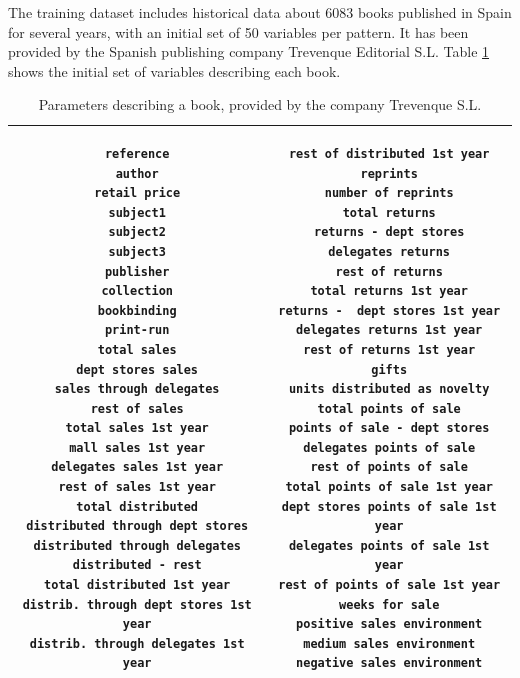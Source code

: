\documentclass[a4paper,10pt,twocolumn,preprint,3p]{elsarticle}
\begin{document}
The training dataset includes historical data about 6083 books
published in Spain for several years, with an initial set of 50
variables per pattern. It has been provided by the Spanish publishing
company Trevenque Editorial S.L. Table 
\ref{tabla:paramsOrig50} shows the initial set of variables describing
each book. 

\begin{table}[!ht]
\caption{Parameters describing a book, provided by the company Trevenque S.L.}
\label{tabla:paramsOrig50}
\begin{center}
\begin{tabular}{|c|c|}
\hline 

\begin{minipage}{2.45in}\begin{small}
 \begin{verbatim}
reference
author
retail price
subject1
subject2
subject3
publisher
collection
bookbinding
print-run
total sales
dept stores sales
sales through delegates
rest of sales
total sales 1st year
mall sales 1st year
delegates sales 1st year
rest of sales 1st year
total distributed
distributed through dept stores
distributed through delegates
distributed - rest
total distributed 1st year
distrib. through dept stores 1st year
distrib. through delegates 1st year
\end{verbatim}
\end{small} \end{minipage}     & 

\begin{minipage}{2.3in} \begin{small}
\begin{verbatim}
rest of distributed 1st year
reprints
number of reprints
total returns
returns - dept stores
delegates returns
rest of returns
total returns 1st year
returns -  dept stores 1st year
delegates returns 1st year
rest of returns 1st year
gifts
units distributed as novelty
total points of sale
points of sale - dept stores
delegates points of sale
rest of points of sale
total points of sale 1st year
dept stores points of sale 1st year
delegates points of sale 1st year
rest of points of sale 1st year
weeks for sale
positive sales environment
medium sales environment
negative sales environment
\end{verbatim}
\end{small} \end{minipage}    \\

\hline
\end{tabular}
\end{center}
\end{table}
\end{document}
